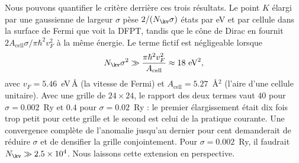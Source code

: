 Nous pouvons quantifier le critère derrière ces trois résultats. Le point $K$ élargi par une gaussienne de largeur $\sigma$ pèse $2/(N_\kv\sigma)$ états par eV et par cellule dans la surface de Fermi que voit la DFPT, tandis que le cône de Dirac en fournit $2A_\text{cell}\sigma/\pi\hbar^2v_F^2$ à la même énergie. Le terme fictif est négligeable lorsque
\begin{equation}
    N_\kv\sigma^2\gg\frac{\pi\hbar^2v_F^2}{A_\text{cell}}\approx 18~\text{eV}^2,\label{eqn:kohn_critere}
\end{equation}
avec $v_F=5.46$~eV\,\AA{} (la vitesse de Fermi) et $A_\text{cell}=5.27$~\AA$^2$ (l'aire d'une cellule unitaire). Avec une grille de $24\times 24$, le rapport des deux termes vaut $40$ pour $\sigma=0.002$~Ry et $0.4$ pour $\sigma=0.02$~Ry : le premier élargissement était dix fois trop petit pour cette grille et le second est celui de la pratique courante. Une convergence complète de l'anomalie jusqu'au dernier pour cent demanderait de réduire $\sigma$ et de densifier la grille conjointement. Pour $\sigma=0.002$~Ry, il faudrait $N_\kv\gg 2.5\times 10^4$. Nous laissons cette extension en perspective.

